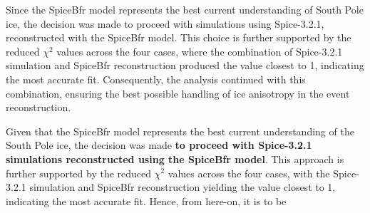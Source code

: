Since the SpiceBfr model represents the best current understanding of South Pole ice, the decision was made to proceed with simulations using Spice-3.2.1, reconstructed with the SpiceBfr model. This choice is further supported by the reduced $\chi^2$ values across the four cases, where the combination of Spice-3.2.1 simulation and SpiceBfr reconstruction produced the value closest to 1, indicating the most accurate fit. Consequently, the analysis continued with this combination, ensuring the best possible handling of ice anisotropy in the event reconstruction.

Given that the SpiceBfr model represents the best current understanding of the South Pole ice, the decision was made \textbf{to proceed with Spice-3.2.1 simulations reconstructed using the SpiceBfr model}. This approach is further supported by the reduced $\chi^2$ values across the four cases, with the Spice-3.2.1 simulation and SpiceBfr reconstruction yielding the value closest to 1, indicating the most accurate fit. Hence, from here-on, it is to be 





    

